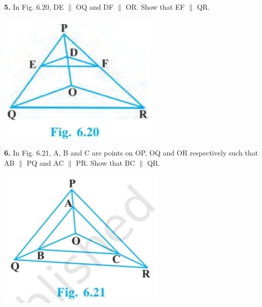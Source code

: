 \documentclass[a4paper,12pt]{article}
\begin{document}
\begin{minipage}[t]{0.6\textwidth}
\vspace{-12em}
\textbf{5.} In Fig. 6.20, DE $\parallel$ OQ and DF $\parallel$ OR.  
Show that EF $\parallel$ QR.
\end{minipage}
\begin{minipage}[t]{0.38\textwidth}
\centering
\includegraphics[width=\linewidth]{a3.jpg}\\
\end{minipage}

\vspace{2em}

\begin{minipage}[t]{0.6\textwidth}
\vspace{-22em}
\textbf{6.} In Fig. 6.21, A, B and C are points on OP, OQ and OR respectively  
such that AB $\parallel$ PQ and AC $\parallel$ PR.  
Show that BC $\parallel$ QR.
\end{minipage}
\begin{minipage}[t]{0.38\textwidth}
\centering
\includegraphics[width=\linewidth]{a4.jpg}\\
\end{minipage}
\end{document}
